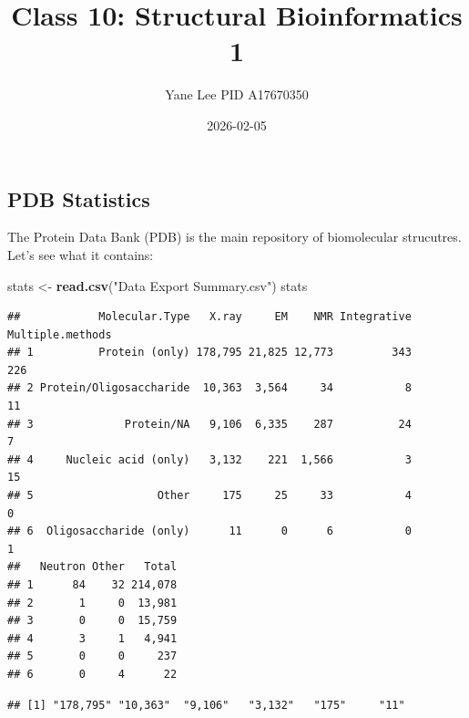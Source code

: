 \documentclass[
]{article}
\title{Class 10: Structural Bioinformatics 1}
\author{Yane Lee PID A17670350}
\date{2026-02-05}
\newenvironment{Shaded}{\begin{snugshade}}{\end{snugshade}}
\newcommand{\FunctionTok}[1]{\textcolor[rgb]{0.13,0.29,0.53}{\textbf{#1}}}
\newcommand{\NormalTok}[1]{#1}
\newcommand{\OtherTok}[1]{\textcolor[rgb]{0.56,0.35,0.01}{#1}}
\newcommand{\SpecialCharTok}[1]{\textcolor[rgb]{0.81,0.36,0.00}{\textbf{#1}}}
\newcommand{\StringTok}[1]{\textcolor[rgb]{0.31,0.60,0.02}{#1}}
\begin{document}
\maketitle

\subsection{PDB Statistics}\label{pdb-statistics}

The Protein Data Bank (PDB) is the main repository of biomolecular
strucutres. Let's see what it contains:

\begin{Shaded}
\begin{Highlighting}[]
\NormalTok{stats }\OtherTok{\textless{}{-}} \FunctionTok{read.csv}\NormalTok{(}\StringTok{"Data Export Summary.csv"}\NormalTok{)}
\NormalTok{stats}
\end{Highlighting}
\end{Shaded}

\begin{verbatim}
##            Molecular.Type   X.ray     EM    NMR Integrative Multiple.methods
## 1          Protein (only) 178,795 21,825 12,773         343              226
## 2 Protein/Oligosaccharide  10,363  3,564     34           8               11
## 3              Protein/NA   9,106  6,335    287          24                7
## 4     Nucleic acid (only)   3,132    221  1,566           3               15
## 5                   Other     175     25     33           4                0
## 6  Oligosaccharide (only)      11      0      6           0                1
##   Neutron Other   Total
## 1      84    32 214,078
## 2       1     0  13,981
## 3       0     0  15,759
## 4       3     1   4,941
## 5       0     0     237
## 6       0     4      22
\end{verbatim}

\begin{Shaded}
\end{Shaded}

\begin{verbatim}
## [1] "178,795" "10,363"  "9,106"   "3,132"   "175"     "11"
\end{verbatim}

\begin{Shaded}
\end{Shaded}
\end{document}
